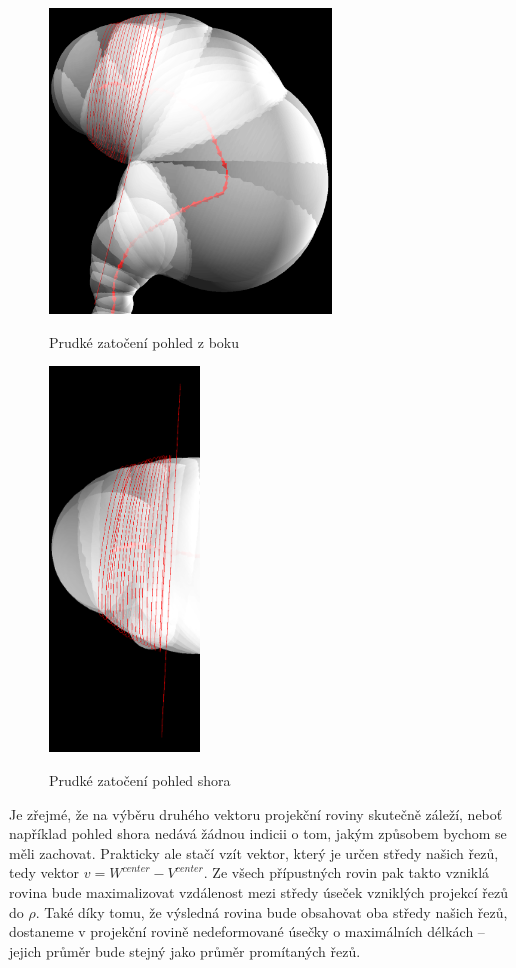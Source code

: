 \begin{figure}[ht]
\begin{minipage}{.6\textwidth}
  \centering
        \includegraphics[width=75mm]{img/sharp_curve_lookahead.png}
        \caption{Prudké zatočení pohled z boku}
    \centering
    \label{fig:sharp_curve_lookahead}
\end{minipage}%
\begin{minipage}{.4\textwidth}
    \centering
        \includegraphics[width=40mm]{img/sharp_curve_lookahead_up.png}
        \caption{Prudké zatočení pohled shora}
    \centering
    \label{fig:sharp_curve_lookahead_from_up}
\end{minipage}
\end{figure}

Je zřejmé, že na výběru druhého vektoru projekční roviny skutečně záleží, neboť
například pohled shora nedává žádnou indicii o tom, jakým způsobem bychom
se měli zachovat. Prakticky ale stačí vzít vektor, který je
určen středy našich řezů, tedy vektor $ v = W^{center} - V^{center} $. Ze všech
přípustných rovin pak takto vzniklá rovina bude maximalizovat vzdálenost mezi
středy úseček vzniklých projekcí řezů do $ \rho $. Také díky tomu, že
výsledná rovina bude obsahovat oba středy našich řezů, dostaneme v projekční
rovině nedeformované úsečky o maximálních délkách – jejich průměr bude stejný
jako průměr promítaných řezů.

